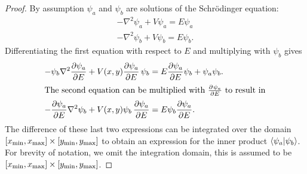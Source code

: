 \begin{proof}
  By assumption $\psi_a$ and $\psi_b$ are solutions of the Schrödinger equation:
  \begin{align*}
    -\nabla^2 \psi_a + V \psi_a = E \psi_a \\
    -\nabla^2 \psi_b + V \psi_b = E \psi_b \text{.}
  \end{align*}
  Differentiating the first equation with respect to $E$ and multiplying with $\psi_b$ gives
  \begin{align*}
    - \psi_b \nabla^2\pdv{\psi_a}{E} + V(x, y)\pdv{\psi_a}{E} \, \psi_b & = E \pdv{\psi_a}{E}\psi_b + \psi_a\psi_b \text{.} \\
    \intertext{The second equation can be multiplied with $ \pdv[]{\psi_a}{E}$ to result in}
    -\pdv{\psi_a}{E} \nabla^2\psi_b  + V(x, y)\psi_b\,\pdv{\psi_a}{E}   & = E \psi_b\pdv{\psi_a}{E} \text{.}
  \end{align*}
  The difference of these last two expressions can be integrated over the domain $[{x_{\text{min}}}, {x_{\text{max}}}]\times[{y_{\text{min}}}, {y_{\text{max}}}]$ to obtain an expression for the inner product $\bra{\psi_a}\ket{\psi_b}$. For brevity of notation, we omit the integration domain, this is assumed to be $[{x_{\text{min}}}, {x_{\text{max}}}] \times [{y_{\text{min}}}, {y_{\text{max}}}]$.


\end{proof}
